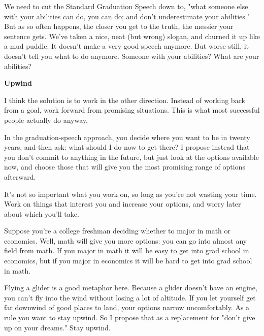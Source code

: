 We
                  need to cut the Standard Graduation Speech down to, "what
                  someone else with your abilities can do, you can do; and don't
                  underestimate your abilities." But as so often happens, the
                  closer you get to the truth, the messier your sentence gets.
                  We've taken a nice, neat (but wrong) slogan, and churned it up
                  like a mud puddle. It doesn't make a very good speech anymore.
                  But worse still, it doesn't tell you what to do anymore.
                  Someone with your abilities? What are your abilities?

\textbf{Upwind}

I think the solution is to work in the other
                  direction. Instead of working back from a goal, work forward
                  from promising situations. This is what most successful people
                  actually do anyway.

In the graduation-speech
                  approach, you decide where you want to be in twenty years, and
                  then ask: what should I do now to get there? I propose instead
                  that you don't commit to anything in the future, but just look
                  at the options available now, and choose those that will give
                  you the most promising range of options afterward.

It's
                  not so important what you work on, so long as you're not
                  wasting your time. Work on things that interest you and
                  increase your options, and worry later about which you'll
                  take.

Suppose you're a college freshman deciding
                  whether to major in math or economics. Well, math will give
                  you more options: you can go into almost any field from math.
                  If you major in math it will be easy to get into grad school
                  in economics, but if you major in economics it will be hard to
                  get into grad school in math.

Flying a glider is a
                  good metaphor here. Because a glider doesn't have an engine,
                  you can't fly into the wind without losing a lot of altitude.
                  If you let yourself get far downwind of good places to land,
                  your options narrow uncomfortably. As a rule you want to stay
                  upwind. So I propose that as a replacement for "don't give up
                  on your dreams." Stay upwind.

